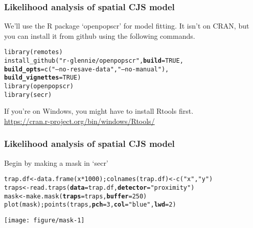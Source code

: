 \documentclass[color=usenames,dvipsnames]{beamer}\usepackage[]{graphicx}\usepackage[]{color}
\makeatletter
\newcommand{\hlnum}[1]{\textcolor[rgb]{0.69,0.494,0}{#1}}%
\newcommand{\hlstr}[1]{\textcolor[rgb]{0.749,0.012,0.012}{#1}}%
\newcommand{\hlopt}[1]{\textcolor[rgb]{0,0,0}{#1}}%
\newcommand{\hlstd}[1]{\textcolor[rgb]{0,0,0}{#1}}%
\newcommand{\hlkwb}[1]{\textcolor[rgb]{0,0.341,0.682}{#1}}%
\newcommand{\hlkwc}[1]{\textcolor[rgb]{0,0,0}{\textbf{#1}}}%
\newcommand{\hlkwd}[1]{\textcolor[rgb]{0.004,0.004,0.506}{#1}}%
\newenvironment{kframe}{%
 \def\at@end@of@kframe{}%
 \ifinner\ifhmode%
  \def\at@end@of@kframe{\end{minipage}}%
  \begin{minipage}{\columnwidth}%
 \fi\fi%
 \def\FrameCommand##1{\hskip\@totalleftmargin \hskip-\fboxsep
 \colorbox{shadecolor}{##1}\hskip-\fboxsep
     \hskip-\linewidth \hskip-\@totalleftmargin \hskip\columnwidth}%
 \MakeFramed {\advance\hsize-\width
   \@totalleftmargin\z@ \linewidth\hsize
   \@setminipage}}%
 {\par\unskip\endMakeFramed%
 \at@end@of@kframe}
\newenvironment{knitrout}{}{} %
\makeatother
\begin{document}
\begin{frame}[fragile]
  \frametitle{Likelihood analysis of spatial CJS model}
  We'll use the R package `openpopscr' for model fitting. It isn't on
  CRAN, but you can install it from github using the following
  commands.
\begin{knitrout}\scriptsize
{}\color{fgcolor}\begin{kframe}
\begin{alltt}
\hlkwd{library}\hlstd{(remotes)}
\hlkwd{install_github}\hlstd{(}\hlstr{"r-glennie/openpopscr"}\hlstd{,} \hlkwc{build} \hlstd{=} \hlnum{TRUE}\hlstd{,}
               \hlkwc{build_opts} \hlstd{=} \hlkwd{c}\hlstd{(}\hlstr{"--no-resave-data"}\hlstd{,} \hlstr{"--no-manual"}\hlstd{),}
               \hlkwc{build_vignettes} \hlstd{=} \hlnum{TRUE}\hlstd{)}
\hlkwd{library}\hlstd{(openpopscr)}
\hlkwd{library}\hlstd{(secr)}
\end{alltt}
\end{kframe}
\end{knitrout}
\vfill
If you're on Windows, you might have to install Rtools first. \\
\centering
\url{https://cran.r-project.org/bin/windows/Rtools/} \\

\end{frame}



\begin{frame}[fragile]
  \frametitle{Likelihood analysis of spatial CJS model}
Begin by making a mask in `secr'
\begin{knitrout}\scriptsize
{}\color{fgcolor}\begin{kframe}
\begin{alltt}
\hlstd{trap.df} \hlkwb{<-} \hlkwd{data.frame}\hlstd{(x}\hlopt{*}\hlnum{1000}\hlstd{);} \hlkwd{colnames}\hlstd{(trap.df)} \hlkwb{<-} \hlkwd{c}\hlstd{(}\hlstr{"x"}\hlstd{,}\hlstr{"y"}\hlstd{)}
\hlstd{traps} \hlkwb{<-} \hlkwd{read.traps}\hlstd{(}\hlkwc{data}\hlstd{=trap.df,} \hlkwc{detector}\hlstd{=}\hlstr{"proximity"}\hlstd{)}
\hlstd{mask} \hlkwb{<-} \hlkwd{make.mask}\hlstd{(}\hlkwc{traps}\hlstd{=traps,} \hlkwc{buffer}\hlstd{=}\hlnum{250}\hlstd{)}
\hlkwd{plot}\hlstd{(mask);} \hlkwd{points}\hlstd{(traps,} \hlkwc{pch}\hlstd{=}\hlnum{3}\hlstd{,} \hlkwc{col}\hlstd{=}\hlstr{"blue"}\hlstd{,} \hlkwc{lwd}\hlstd{=}\hlnum{2}\hlstd{)}
\end{alltt}
\end{kframe}

{\centering \texttt{[image: figure/mask-1]} 

}



\end{knitrout}
\end{frame}
\end{document}
